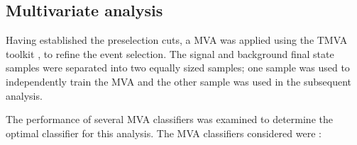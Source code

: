 
\subsection{Multivariate analysis}
\label{sec:mva1400GeV}
Having established the preselection cuts, a MVA was applied using the TMVA toolkit \cite{Hocker:2007ht}, to refine the event selection.  The signal and background final state samples were separated into two equally sized samples; one sample was used to independently train the MVA and the other sample was used in the subsequent analysis.  

The performance of several MVA classifiers was examined to determine the optimal classifier for this analysis.  The MVA classifiers considered were \cite{Hocker:2007ht}:
